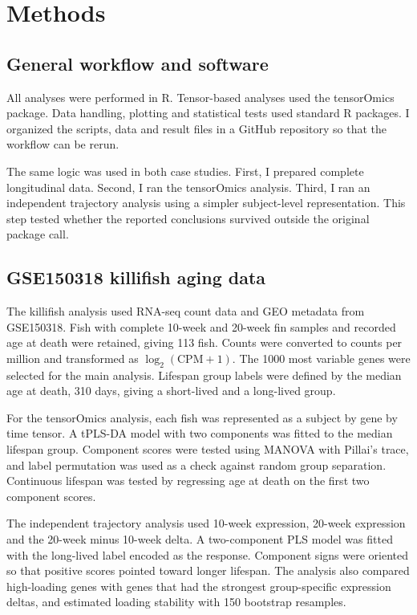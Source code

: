 \documentclass[11pt,a4paper]{article}
\begin{document}
\section{Methods}

\subsection{General workflow and software}

All analyses were performed in R. Tensor-based analyses used the tensorOmics package. Data handling, plotting and statistical tests used standard R packages. I organized the scripts, data and result files in a GitHub repository so that the workflow can be rerun.

The same logic was used in both case studies. First, I prepared complete longitudinal data. Second, I ran the tensorOmics analysis. Third, I ran an independent trajectory analysis using a simpler subject-level representation. This step tested whether the reported conclusions survived outside the original package call.

\subsection{GSE150318 killifish aging data}

The killifish analysis used RNA-seq count data and GEO metadata from GSE150318. Fish with complete 10-week and 20-week fin samples and recorded age at death were retained, giving 113 fish. Counts were converted to counts per million and transformed as $\log_2(\mathrm{CPM}+1)$. The 1000 most variable genes were selected for the main analysis. Lifespan group labels were defined by the median age at death, 310 days, giving a short-lived and a long-lived group.

For the tensorOmics analysis, each fish was represented as a subject by gene by time tensor. A tPLS-DA model with two components was fitted to the median lifespan group. Component scores were tested using MANOVA with Pillai's trace, and label permutation was used as a check against random group separation. Continuous lifespan was tested by regressing age at death on the first two component scores.

The independent trajectory analysis used 10-week expression, 20-week expression and the 20-week minus 10-week delta. A two-component PLS model was fitted with the long-lived label encoded as the response. Component signs were oriented so that positive scores pointed toward longer lifespan. The analysis also compared high-loading genes with genes that had the strongest group-specific expression deltas, and estimated loading stability with 150 bootstrap resamples.
\end{document}

